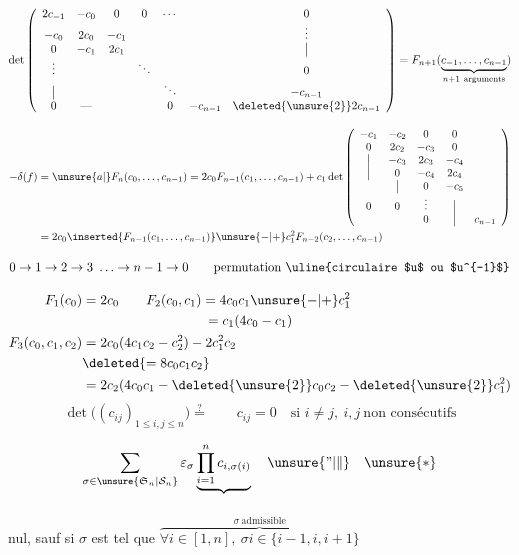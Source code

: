 \[
\det\left(\begin{array}{ccccccc}
2c_{-1}&-c_0&0&0&\cdots&&0\\
-c_0&2c_0&-c_1&&&&\vdots\\
0&-c_1&2c_1&&&&\big|\\
\vdots&&&\ddots&&&0\\
\big|&&&&\ddots&&-c_{n-1}\\
0&\text{---}&&&0&-c_{n-1}&\deleted{\unsure{2}}2c_{n-1}
\end{array}\right)
=F_{n+1}(\underbrace{c_{-1},\ldots,c_{n-1}}_{n+1\ \text{arguments}})
\]

\[
\begin{aligned}
-\delta(f)&=\unsure{a|{}}F_n(c_0,\ldots,c_{n-1})=2c_0F_{n-1}(c_1,\ldots,c_{n-1})+c_1\det
\left(\begin{array}{ccccc}
-c_1&-c_2&0&0&\\
0&2c_2&-c_3&0&\\
\big|&-c_3&2c_3&-c_4&\\
\big|&0&-c_4&2c_4&\\
&\big|&0&-c_5&\\
0&0&\vdots&\big|&\\
&&0&\big|&c_{n-1}
\end{array}\right)\\
&=2c_0\inserted{F_{n-1}(c_1,\ldots,c_{n-1})}\unsure{-|+}c_1^2F_{n-2}(c_2,\ldots,c_{n-1})
\end{aligned}
\]

\[
0\to1\to2\to3\ \ldots\to n-1\to0\qquad\text{permutation \uline{circulaire $u$ ou $u^{-1}$}}
\]

\[
\begin{aligned}
F_1(c_0)&=2c_0\qquad F_2(c_0,c_1)=4c_0c_1\unsure{-|+}c_1^2\\
&\hspace{9em}=c_1(4c_0-c_1)\\
F_3(c_0,c_1,c_2)&=2c_0(4c_1c_2-c_2^2)-2c_1^2c_2\\
&\deleted{=8c_0c_1c_2}\\
&=2c_2(4c_0c_1-\deleted{\unsure{2}}c_0c_2-\deleted{\unsure{2}}c_1^2)
\end{aligned}
\]
\[
\det\bigl((c_{ij})_{1\le i,j\le n}\bigr)\overset{?}{=}
\qquad c_{ij}=0\quad\text{si } i\ne j,\ i,j\ \text{non consécutifs}
\]

\[
\sum_{\sigma\in\unsure{\mathfrak S_n|\mathcal S_n}}\varepsilon_\sigma
\underbrace{\prod_{i=1}^{n} c_{i,\sigma(i)}}_{\phantom{c_{ii}}}
\quad\unsure{\text{''}|\Vert}\quad\unsure{*}
\]
nul, sauf si $\sigma$ est tel que $\overbrace{\forall i\in[1,n],\ \sigma i\in\{i-1,i,i+1\}}^{\sigma\ \text{admissible}}$

